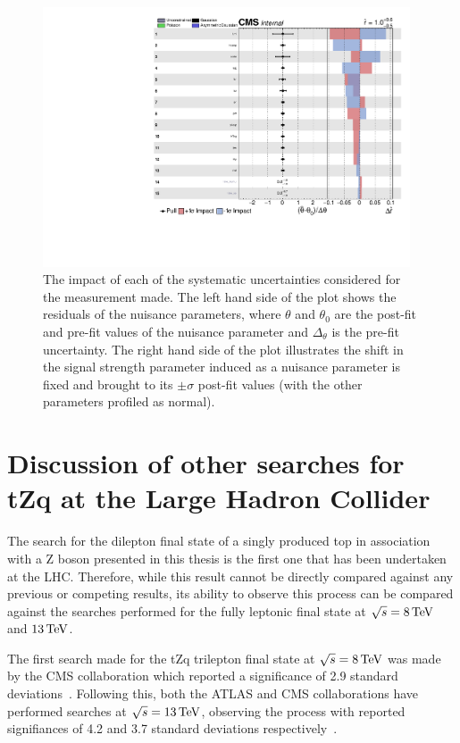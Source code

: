 \begin{figure}[htbp]
\begin{center}
\includegraphics[width=0.97\textwidth]{figs/results/systematicsImpact.pdf}
\caption{The impact of each of the systematic uncertainties considered for the measurement made. The left hand side of the plot shows the residuals of the nuisance parameters, where $\theta$ and $\theta_{0}$ are the post-fit and pre-fit values of the nuisance parameter and $\Delta_{\theta}$ is the pre-fit uncertainty. The right hand side of the plot illustrates the shift in the signal strength parameter induced as a nuisance parameter is fixed and brought to its $\pm \sigma$ post-fit values (with the other parameters profiled as normal).}
\label{fig:systematicsPull}
\end{center}
\end{figure}

\section{Discussion of other searches for tZq at the Large Hadron Collider}
The search for the dilepton final state of a singly produced top in association with a Z boson presented in this thesis is the first one that has been undertaken at the LHC.
Therefore, while this result cannot be directly compared against any previous or competing results, its ability to observe this process can be compared against the searches performed for the fully leptonic	final state at $\sqrt{s} = 8 \,\text{Te\hspace{-.08em}V}$ and $13 \,\text{Te\hspace{-.08em}V}$.

The first search made for the tZq trilepton final state at $\sqrt{s} = 8 \,\text{Te\hspace{-.08em}V}$ was made by the CMS collaboration which reported a significance of 2.9 standard deviations~\cite{Sirunyan:2017kkr}.
Following this, both the ATLAS and CMS collaborations have performed searches at $\sqrt{s} = 13 \,\text{Te\hspace{-.08em}V}$, observing the process with reported signifiances of 4.2 and 3.7 standard deviations respectively~\cite{Aaboud:2017ylb,Sirunyan:2017nbr}.

